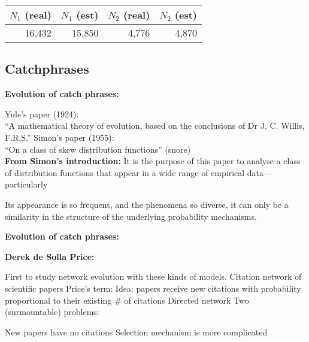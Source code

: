     \medskip

    {
      \begin{tabular}{|r|r|r|r|}
        \hline
        $N_1$ (real) & $N_1$ (est) & $N_2$ (real) & $N_2$ (est) \\
        \hline
        16,432 & 15,850 & 4,776 &  4,870 \\
        \hline
      \end{tabular}
    }
  


\subsection{Catchphrases}

  \textbf{Evolution of catch phrases:}

  
  
     Yule's paper (1924)\cite{yule1924a}:\\
  ``A mathematical theory of evolution, based on the conclusions of Dr J. C. Willis, F.R.S.''
    Simon's paper (1955)\cite{simon1955a}:\\
  ``On a class of skew distribution functions'' (snore)\\
  
  

  \textbf{From Simon's introduction:}
    {It is the purpose of this paper to analyse a class of distribution
      functions that appear in a wide range of empirical data}{---particularly 
      }

    \smallskip

    {Its appearance is so frequent, and the phenomena so diverse,}
    {}
    {it can only be a similarity 
      in the structure of the underlying probability mechanisms.}
  
  

  \textbf{Evolution of catch phrases:}

  \textbf{Derek de Solla Price:}
  
   First to study network evolution
    with these kinds of models.
   Citation network of scientific papers
   Price's term: 
   Idea: papers receive new citations with probability proportional
    to their existing \# of citations
   Directed network
   Two (surmountable) problems:
    
     New papers have no citations
     Selection mechanism is more complicated
    
